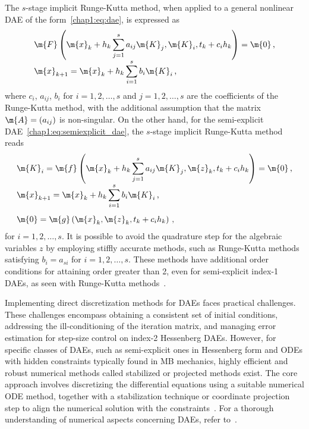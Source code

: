 The $s$-stage implicit Runge-Kutta method, when applied to a general nonlinear \ac{DAE} of the form~\eqref{chap1:eq:dae}, is expressed as
%
\begin{equation*}
  \begin{array}{l}
    \m{F}\left(\m{x}_{k} + h_k\displaystyle\sum_{j=1}^{s}a_{ij} \m{K}_j, \m{K}_i, t_{k} + c_i h_k\right) = \m{0} \, \text{,} \\[1em]
    \m{x}_{k+1} = \m{x}_{k} + h_k\displaystyle\sum_{i=1}^{s} b_i \m{K}_i \, \text{,}
  \end{array}
\end{equation*}
%
where $c_i$, $a_{ij}$, $b_i$ for $i = 1, 2, \dots, s$ and $j = 1, 2, \dots, s$ are the coefficients of the Runge-Kutta method, with the additional assumption that the matrix $\m{A} = (a_{ij})$ is non-singular. On the other hand, for the semi-explicit \ac{DAE}~\eqref{chap1:eq:semiexplicit_dae}, the $s$-stage implicit Runge-Kutta method reads
%
\begin{equation*}
  \begin{array}{l}
    \m{K}_i = \m{f}\left(\m{x}_{k} + h_k\displaystyle\sum_{j=1}^{s}a_{ij} \m{K}_j, \m{z}_{k}, t_{k} + c_i h_k\right) = \m{0} \, \text{,} \\[1em]
    \m{x}_{k+1} = \m{x}_{k} + h_k\displaystyle\sum_{i=1}^{s} b_i \m{K}_i \, \text{,} \\[1.75em]
    \m{0} = \m{g}\left(\m{x}_{k}, \m{z}_{k}, t_{k} + c_i h_k\right) \, \text{,}
  \end{array}
\end{equation*}
%
for $i = 1, 2, \dots, s$. It is possible to avoid the quadrature step for the algebraic variables $z$ by employing stiffly accurate methods, such as Runge-Kutta methods satisfying $b_i = a_{si}$ for $i = 1, 2, \dots, s$. These methods have additional order conditions for attaining order greater than 2, even for semi-explicit index-1 \acp{DAE}, as seen with Runge-Kutta methods~\cite{brenan1995numerical}.

Implementing direct discretization methods for \acp{DAE} faces practical challenges. These challenges encompass obtaining a consistent set of initial conditions, addressing the ill-conditioning of the iteration matrix, and managing error estimation for step-size control on index-2 Hessenberg \acp{DAE}. However, for specific classes of \acp{DAE}, such as semi-explicit ones in Hessenberg form and \acp{ODE} with hidden constraints typically found in \ac{MB} mechanics, highly efficient and robust numerical methods called stabilized or projected methods exist. The core approach involves discretizing the differential equations using a suitable numerical \ac{ODE} method, together with a stabilization technique or coordinate projection step to align the numerical solution with the constraints~\cite{eichsoellner1998numerical}. For a thorough understanding of numerical aspects concerning \acp{DAE}, refer to~\cite{ascher1998computer, brenan1995numerical, hairer1999stiff}.


